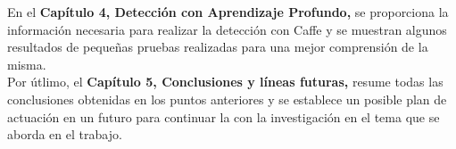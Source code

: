 En el \textbf{Capítulo 4, Detección con Aprendizaje Profundo,}  se proporciona la información necesaria para realizar la detección con Caffe y se muestran algunos resultados de pequeñas pruebas realizadas para una mejor comprensión de la misma.\\

Por útlimo, el \textbf{Capítulo 5, Conclusiones y líneas futuras,} resume todas las conclusiones obtenidas en los puntos anteriores y se establece un posible plan de actuación en un futuro para continuar la con la investigación en el tema que se aborda en el trabajo.
